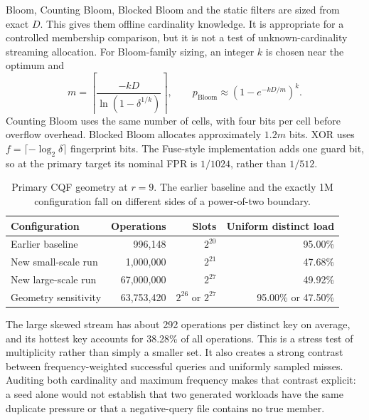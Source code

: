 Bloom, Counting Bloom, Blocked Bloom and the static filters are sized from exact $D$. This gives them offline cardinality knowledge. It is appropriate for a controlled membership comparison, but it is not a test of unknown-cardinality streaming allocation. For Bloom-family sizing, an integer $k$ is chosen near the optimum and
\begin{equation}
m=\left\lceil\frac{-kD}{\ln(1-\delta^{1/k})}\right\rceil,\qquad
p_{\mathrm{Bloom}}\approx(1-e^{-kD/m})^k.
\label{eq:bloom}
\end{equation}
Counting Bloom uses the same number of cells, with four bits per cell before overflow overhead. Blocked Bloom allocates approximately $1.2m$ bits. XOR uses $f=\lceil-\log_2\delta\rceil$ fingerprint bits. The Fuse-style implementation adds one guard bit, so at the primary target its nominal FPR is $1/1024$, rather than $1/512$.

\begin{table}[!htbp]\centering\small
\caption{Primary CQF geometry at $r=9$. The earlier baseline and the exactly 1M configuration fall on different sides of a power-of-two boundary.}
\label{tab:geometry}
\begin{tabular}{lrrr}\toprule
\textbf{Configuration}&\textbf{Operations}&\textbf{Slots}&\textbf{Uniform distinct load}\\\midrule
Earlier baseline&996,148&$2^{20}$&95.00\%\\
New small-scale run&1,000,000&$2^{21}$&47.68\%\\
New large-scale run&67,000,000&$2^{27}$&49.92\%\\
Geometry sensitivity&63,753,420&$2^{26}$ or $2^{27}$&95.00\% or 47.50\%\\\bottomrule
\end{tabular}
\end{table}
The large skewed stream has about 292 operations per distinct key on average, and its hottest key accounts for 38.28\% of all operations. This is a stress test of multiplicity rather than simply a smaller set. It also creates a strong contrast between frequency-weighted successful queries and uniformly sampled misses. Auditing both cardinality and maximum frequency makes that contrast explicit: a seed alone would not establish that two generated workloads have the same duplicate pressure or that a negative-query file contains no true member.
\clearpage

